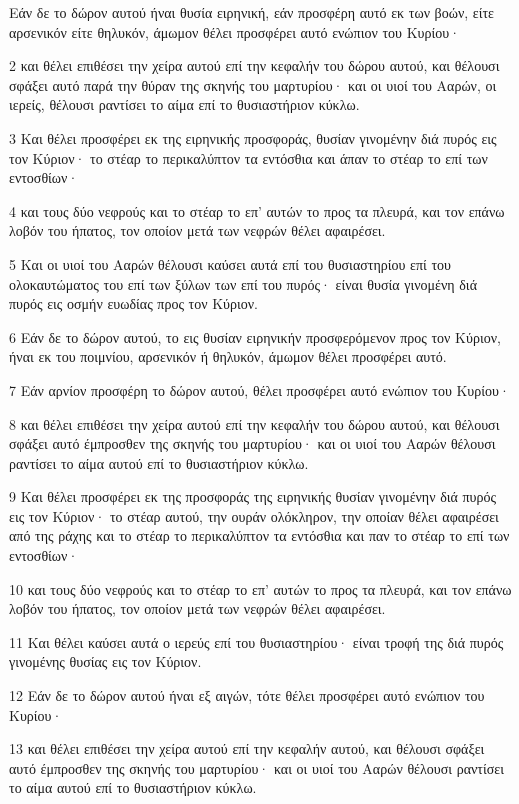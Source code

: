 \par Εάν δε το δώρον αυτού ήναι θυσία ειρηνική, εάν προσφέρη αυτό εκ των βοών, είτε αρσενικόν είτε θηλυκόν, άμωμον θέλει προσφέρει αυτό ενώπιον του Κυρίου·
\par 2 και θέλει επιθέσει την χείρα αυτού επί την κεφαλήν του δώρου αυτού, και θέλουσι σφάξει αυτό παρά την θύραν της σκηνής του μαρτυρίου· και οι υιοί του Ααρών, οι ιερείς, θέλουσι ραντίσει το αίμα επί το θυσιαστήριον κύκλω.
\par 3 Και θέλει προσφέρει εκ της ειρηνικής προσφοράς, θυσίαν γινομένην διά πυρός εις τον Κύριον· το στέαρ το περικαλύπτον τα εντόσθια και άπαν το στέαρ το επί των εντοσθίων·
\par 4 και τους δύο νεφρούς και το στέαρ το επ' αυτών το προς τα πλευρά, και τον επάνω λοβόν του ήπατος, τον οποίον μετά των νεφρών θέλει αφαιρέσει.
\par 5 Και οι υιοί του Ααρών θέλουσι καύσει αυτά επί του θυσιαστηρίου επί του ολοκαυτώματος του επί των ξύλων των επί του πυρός· είναι θυσία γινομένη διά πυρός εις οσμήν ευωδίας προς τον Κύριον.
\par 6 Εάν δε το δώρον αυτού, το εις θυσίαν ειρηνικήν προσφερόμενον προς τον Κύριον, ήναι εκ του ποιμνίου, αρσενικόν ή θηλυκόν, άμωμον θέλει προσφέρει αυτό.
\par 7 Εάν αρνίον προσφέρη το δώρον αυτού, θέλει προσφέρει αυτό ενώπιον του Κυρίου·
\par 8 και θέλει επιθέσει την χείρα αυτού επί την κεφαλήν του δώρου αυτού, και θέλουσι σφάξει αυτό έμπροσθεν της σκηνής του μαρτυρίου· και οι υιοί του Ααρών θέλουσι ραντίσει το αίμα αυτού επί το θυσιαστήριον κύκλω.
\par 9 Και θέλει προσφέρει εκ της προσφοράς της ειρηνικής θυσίαν γινομένην διά πυρός εις τον Κύριον· το στέαρ αυτού, την ουράν ολόκληρον, την οποίαν θέλει αφαιρέσει από της ράχης και το στέαρ το περικαλύπτον τα εντόσθια και παν το στέαρ το επί των εντοσθίων·
\par 10 και τους δύο νεφρούς και το στέαρ το επ' αυτών το προς τα πλευρά, και τον επάνω λοβόν του ήπατος, τον οποίον μετά των νεφρών θέλει αφαιρέσει.
\par 11 Και θέλει καύσει αυτά ο ιερεύς επί του θυσιαστηρίου· είναι τροφή της διά πυρός γινομένης θυσίας εις τον Κύριον.
\par 12 Εάν δε το δώρον αυτού ήναι εξ αιγών, τότε θέλει προσφέρει αυτό ενώπιον του Κυρίου·
\par 13 και θέλει επιθέσει την χείρα αυτού επί την κεφαλήν αυτού, και θέλουσι σφάξει αυτό έμπροσθεν της σκηνής του μαρτυρίου· και οι υιοί του Ααρών θέλουσι ραντίσει το αίμα αυτού επί το θυσιαστήριον κύκλω.
